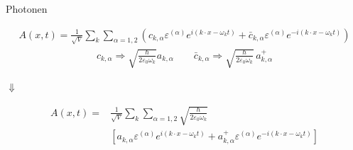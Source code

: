 \documentclass{beamer}
\begin{document}
\begin{frame}[t]{Photonen}
	\vspace*{-0.5cm}
	\begin{center}
		
		\begin{minipage}{0.35\textwidth}
			\begin{align*}
			A(x,t) = \frac{1}{\sqrt{V}} \sum_k \sum_{\alpha=1,2} \left(c_{k,\alpha} \varepsilon^{(\alpha)} e^{i (k \cdot x - \omega_k t)} + \bar{c}_{k,\alpha} \varepsilon^{(\alpha)} e^{-i(k \cdot x - \omega_k t)}\right)
			\end{align*}
			\begin{align*}
			c_{k,\alpha} \Rightarrow \sqrt{\frac{\hbar}{2 \varepsilon_0 \omega_k}} a_{k,\alpha} \qquad 
			\bar{c}_{k,\alpha} \Rightarrow \sqrt{\frac{\hbar}{2 \varepsilon_0 \omega_k}} \, a^+_{k,\alpha}
			\end{align*}
		\end{minipage}
		
		\vspace*{0.5cm}
		$\Downarrow$
		
		\begin{minipage}{0.35\textwidth}
			\begin{align*}
			A(x,t) = &\frac{1}{\sqrt{V}} \sum_k \sum_{\alpha=1,2} \sqrt{\frac{\hbar}{2 \varepsilon_0 \omega_k}} \\
			&\left[a_{k,\alpha} \varepsilon^{(\alpha)} e^{i (k \cdot x - \omega_k t)} + a^+_{k,\alpha} \varepsilon^{(\alpha)} e^{-i (k \cdot x - \omega_k t)}\right]
			\end{align*}
		\end{minipage}
		
	\end{center}
\end{frame}
\end{document}
